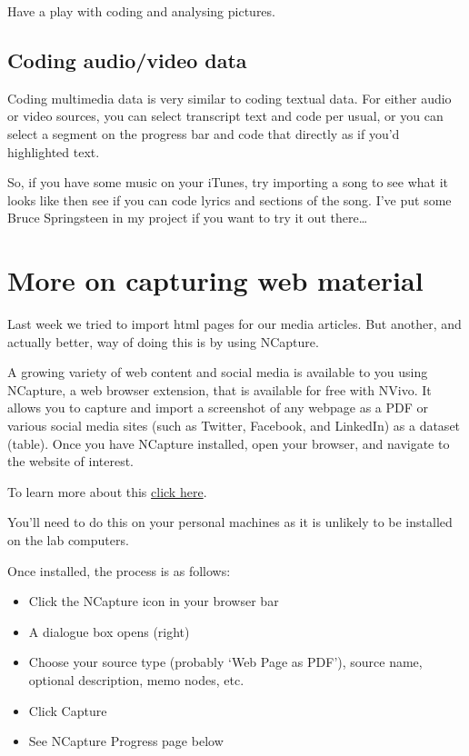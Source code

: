 \documentclass[]{book}
\providecommand{\tightlist}{%
  \setlength{\itemsep}{0pt}\setlength{\parskip}{0pt}}
\theoremstyle{definition}
\theoremstyle{definition}
\theoremstyle{definition}
\theoremstyle{remark}
\begin{document}
Have a play with coding and analysing pictures.

\hypertarget{coding-audiovideo-data}{%
\subsection{Coding audio/video data}\label{coding-audiovideo-data}}

Coding multimedia data is very similar to coding textual data. For
either audio or video sources, you can select transcript text and code
per usual, or you can select a segment on the progress bar and code that
directly as if you'd highlighted text.

So, if you have some music on your iTunes, try importing a song to see
what it looks like then see if you can code lyrics and sections of the
song. I've put some Bruce Springsteen in my project if you want to try
it out there\ldots{}

\hypertarget{more-on-capturing-web-material}{%
\section{More on capturing web
material}\label{more-on-capturing-web-material}}

Last week we tried to import html pages for our media articles. But
another, and actually better, way of doing this is by using NCapture.

A growing variety of web content and social media is available to you
using NCapture, a web browser extension, that is available for free with
NVivo. It allows you to capture and import a screenshot of any webpage
as a PDF or various social media sites (such as Twitter, Facebook, and
LinkedIn) as a dataset (table). Once you have NCapture installed, open
your browser, and navigate to the website of interest.

To learn more about this
\href{http://www.qsrinternational.com/nvivo/support-overview/faqs/what-is-ncapture}{click
here}.

You'll need to do this on your personal machines as it is unlikely to be
installed on the lab computers.

Once installed, the process is as follows:

\begin{itemize}
\tightlist
\item
  Click the NCapture icon in your browser bar
\item
  A dialogue box opens (right)
\item
  Choose your source type (probably `Web Page as PDF'), source name,
  optional description, memo nodes, etc.
\item
  Click Capture
\item
  See NCapture Progress page below
\end{itemize}
\end{document}
